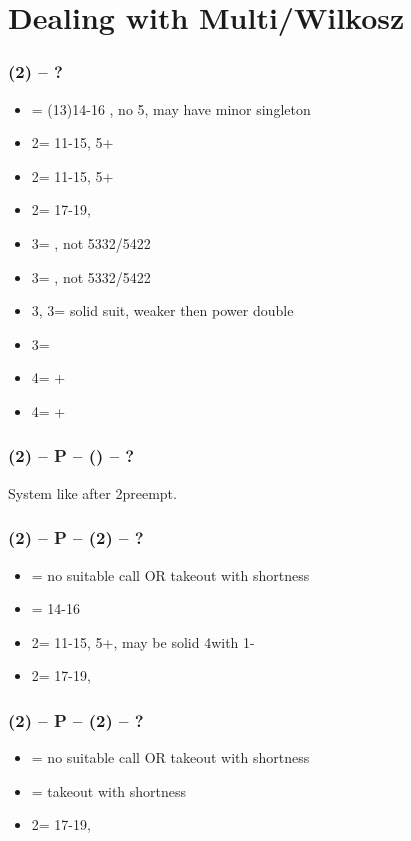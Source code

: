 \section{\texorpdfstring{Dealing with Multi/Wilkosz}{dealingWithMulti}}\label{sec:dealingWithMulti}

\subsubsection*{(2\diams) -- ?}
\begin{itemize}
    \item \dbl = (13)14-16 \bal, no 5\major, may have minor singleton \vimp
    \item 2\hearts = 11-15, 5+\hearts
    \item 2\spades = 11-15, 5+\spades
    \item 2\nt = 17-19, \bal
    \item 3\clubs = \clubs, not 5332/5422
    \item 3\diams = \diams, not 5332/5422
    \item 3\hearts, 3\spades = solid suit, weaker then power double
    \item 3\nt = \minor \vimp
    \item 4\clubs = \clubs+\major
    \item 4\diams = \diams+\major
\end{itemize}

\subsubsection*{(2\diams) -- P -- () -- ?}
System like after 2\diams preempt.

\subsubsection*{(2\diams) -- P -- (2\hearts) -- ?}
\begin{itemize}
    \item \pass = no suitable call OR takeout with \spades shortness
    \item \dbl = 14-16 \bal \vimp
    \item 2\spades = 11-15, 5+\spades, may be solid 4\spades with 1-\hearts
    \item 2\nt = 17-19, \bal
\end{itemize}

\subsubsection*{(2\diams) -- P -- (2\spades) -- ?}
\begin{itemize}
    \item \pass = no suitable call OR takeout with \hearts shortness \imp
    \item \dbl = takeout with \spades shortness \imp
    \item 2\nt = 17-19, \bal
\end{itemize}

